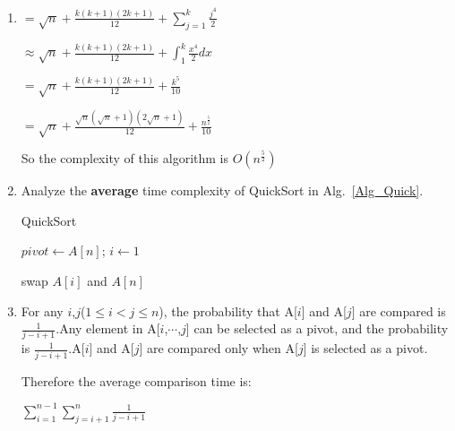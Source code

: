\documentclass[12pt,a4paper]{article}
\makeatletter
\newtheorem*{solution}{Solution}
\theoremstyle{definition}
\renewenvironment{solution}[1][Solution] {\par\pushQED{\qed}\normalfont\topsep6\p@\@plus6\p@\relax\trivlist\item[\hskip\labelsep\bfseries#1\@addpunct{.}]\ignorespaces}{\popQED\endtrivlist\@endpefalse} \makeatother
\makeatother
\begin{document}
\begin{enumerate}
\begin{solution}
            \quad$=\sqrt{n}+\frac{k(k+1)(2k+1)}{12}+\sum_{j=1}^k \frac{j^4}{2} $
            
           \quad $\approx\sqrt{n}+\frac{k(k+1)(2k+1)}{12}+\int_{1}^{k} \frac{x^4}{2}dx $
            
           \quad $=\sqrt{n}+\frac{k(k+1)(2k+1)}{12}+\frac{k^5}{10} $
            
          \quad  $=\sqrt{n}+\frac{\sqrt{n}(\sqrt{n}+1)(2\sqrt{n}+1)}{12}+\frac{n^{\frac{5}{2}}}{10} $

            So the complexity of this algorithm is $O(n^{\frac{5}{2}})$ 

    \end{solution}




    \item
    Analyze the \textbf{average} time complexity of QuickSort in Alg.~\ref{Alg_Quick}.

    \begin{minipage}[t]{0.8\textwidth}
    \begin{algorithm}[H]

      \BlankLine
      \caption{QuickSort}\label{Alg_Quick}


      $pivot \leftarrow A[n]$; $i \leftarrow 1$\;

      swap $A[i]$ and $A[n]$\;
    \end{algorithm}
    \end{minipage}

    \begin{solution}
        For any $i$,$j$($1\le i<j\le n$), the probability that A[$i$] and A[$j$] are compared is $\frac{1}{j-i+1}$.Any element in A[$i$,$\cdots$,$j$] can be selected as a pivot, and the probability is $\frac{1}{j-i+1}$.A[$i$] and A[$j$] are compared only when A[$j$] is selected as a pivot.
        
        Therefore the average comparison time is:
        
        \quad$\sum_{i=1}^{n-1}\sum_{j=i+1}^{n}\frac{1}{j-i+1}$
        

\end{solution}
\end{enumerate}
\end{document}
